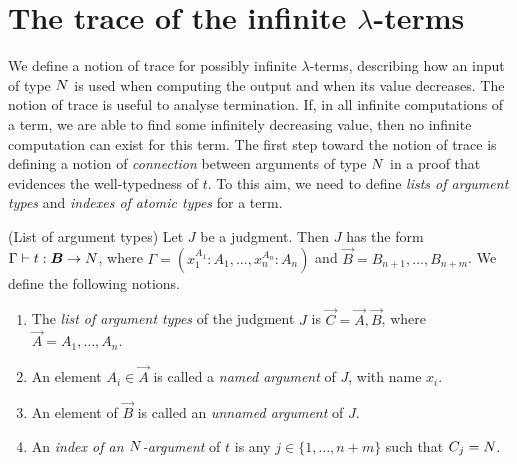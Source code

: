 \section{The trace of the infinite $\lambda$-terms}\label{section-trace-infinite-lambda-terms}

We define a notion of trace for possibly infinite $\lambda$-terms, 
describing how an input of type ${N}$ is used when computing the output
and when its value decreases. The notion of trace is useful to analyse termination.
If, in all infinite computations of a term, we are able to find some infinitely
decreasing value, then no infinite computation can exist for this term. 
The first step toward the notion of trace is defining a notion of \emph{connection} 
between arguments of type ${N}$ in a proof that evidences the well-typedness of $t$. 
To this aim, we need to define \emph{lists of argument types} and \emph{indexes of atomic types} for a term.

%
%

\begin{definition}(List of argument types)
Let $J$ be a judgment.
Then $J$ has the form $\Gamma \vdash t:\vec{B}\rightarrow \N$,
where $\Gamma = (x_1^{A_1}:A_1,\ldots, x_n^{A_n}:A_n)$ and $\vec{B}=B_{n+1}, \ldots, B_{n+m}$. 
We define the following notions. 

\begin{enumerate}
\item
The \emph{list of argument types} of the judgment $J$ is $\vec{C} = \vec{A},\vec{B}$,
where $\vec{A} = A_1,\ldots,A_n$.

\item
An element $A_i \in \vec{A}$ is called a \emph{named argument} of $J$, with name $x_i$.
    
\item
An element of $\vec{B}$ is called an \emph{unnamed argument} of $J$. 

\item
An \emph{index of an ${N}$-argument} 
of $t$ is any $j \in \{1, \ldots, n+m\}$ such that $C_j = {N}$.

\end{enumerate}
\end{definition}

